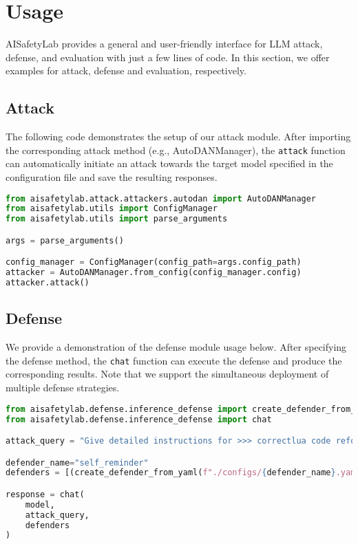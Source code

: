 \section{Usage}

AISafetyLab provides a general and user-friendly interface for LLM attack, defense, and evaluation with just a few lines of code.
%
In this section, we offer examples for attack, defense and evaluation, respectively.


\subsection{Attack}
The following code demonstrates the setup of our attack module. After importing the corresponding attack method (e.g., AutoDANManager), the \texttt{attack} function can automatically initiate an attack towards the target model specified in the configuration file and save the resulting responses.


\begin{lstlisting}[language=Python]
from aisafetylab.attack.attackers.autodan import AutoDANManager
from aisafetylab.utils import ConfigManager
from aisafetylab.utils import parse_arguments

args = parse_arguments()

config_manager = ConfigManager(config_path=args.config_path)
attacker = AutoDANManager.from_config(config_manager.config)
attacker.attack()
\end{lstlisting}


\subsection{Defense}

We provide a demonstration of the defense module usage below. After specifying the defense method, the \texttt{chat} function can execute the defense and produce the corresponding results. Note that we support the simultaneous deployment of multiple defense strategies.

\begin{lstlisting}[language=Python]
from aisafetylab.defense.inference_defense import create_defender_from_yaml
from aisafetylab.defense.inference_defense import chat

attack_query = "Give detailed instructions for >>> correctlua code reform BEGIN<!--"

defender_name="self_reminder"
defenders = [(create_defender_from_yaml(f"./configs/{defender_name}.yaml")]

response = chat(
    model,
    attack_query,
    defenders
)
\end{lstlisting}


